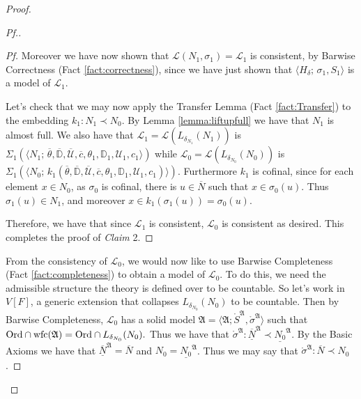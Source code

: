 \documentclass{amsart}
\theoremstyle{definition}
\theoremstyle{remark}
\newcommand{\D}{\mathbb{D}}
\newcommand{\N}{{\overline{N}}}
\newcommand{\U}{\mathcal{U}}
\newcommand{\Ord}{\textup{\ensuremath{\text{Ord}}}}
\DeclareMathOperator{\wfc}{wfc}
\begin{document}
\begin{proof}
\begin{proof}[Pf.]
\begin{proof}[Pf]
Moreover we have now shown that $\mathcal L(N_1, \sigma_1) = \mathcal L_1$ is consistent, by Barwise Correctness (Fact \ref{fact:correctness}), since we have just shown that $\langle H_{\delta}; \, \sigma_1, S_1 \rangle$ is a model of $\mathcal L_1$.

Let's check that we may now apply the Transfer Lemma (Fact \ref{fact:Transfer}) to the embedding $k_1:N_1 \prec N_0$. By Lemma \ref{lemma:liftupfull} we have that $N_1$ is almost full. We also have that $\mathcal L_1 = \mathcal L(L_{\delta_{N_1}}(N_1))$ is 
	$\text{$\Sigma_1(\langle N_1; \, \overline \theta, \overline{\D}, \overline{\U}, \overline c, \theta_1, \D_1, \U_1, c_1 \rangle)$}$ while $\mathcal L_0=\mathcal L(L_{\delta_{N_0}}(N_0))$ is 
	$\text{$\Sigma_1(\langle N_0;\,k_1(\overline \theta, \overline{\D}, \overline{\U}, \overline c, \theta_1, \D_1, \U_1, c_1)\rangle)$.}$
Furthermore $k_1$ is cofinal, since for each element $x \in N_0$, as $\sigma_0$ is cofinal, there is $u \in \N$ such that $x \in \sigma_0(u)$. Thus $\sigma_1(u) \in N_1$, and moreover $x \in k_1(\sigma_1(u))=\sigma_0(u)$. 

Therefore, we have that since $\mathcal L_1$ is consistent, $\mathcal L_0$ is consistent as desired. This completes the proof of \textit{Claim} 2. \end{proof}


From the consistency of $\mathcal L_0$, we would now like to use Barwise Completeness (Fact \ref{fact:completeness}) to obtain a model of $\mathcal L_0$. To do this, we need the admissible structure the theory is defined over to be countable. So let's work in $V[F]$, a generic extension that collapses $L_{\delta_{N_0}}(N_0)$ to be countable. Then by Barwise Completeness, $\mathcal L_0$ has a solid model 
	$\mathfrak A = \langle \mathfrak A; \mathring{S}^{\mathfrak A}, \mathring{\sigma}^{\mathfrak A} \rangle$ such that $\Ord \cap \wfc(\mathfrak A) = \Ord \cap L_{\delta_{N_0}}(N_0).$
Thus we have that $\mathring \sigma^{\mathfrak A}: \overline{\underline N}^{\mathfrak A} \prec \underline{N_0}^{\mathfrak A}$. By the \textsf{Basic Axioms} we have that $\overline{\underline N}^{\mathfrak A}=\N$ and $N_0=\underline{N_0}^{\mathfrak A}$. Thus we may say that  $\mathring \sigma^{\mathfrak A}: \N \prec N_0$. 


\end{proof}
\end{proof}
\end{document}
